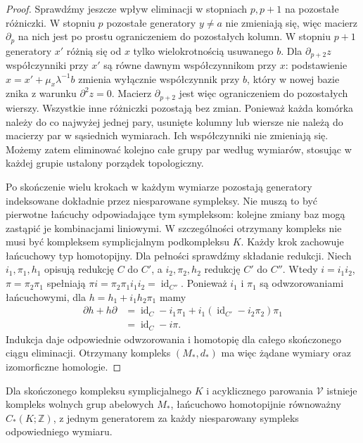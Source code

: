 \begin{proof}
Sprawdźmy jeszcze wpływ eliminacji w stopniach
$p,p+1$ na pozostałe różniczki. W stopniu $p$
pozostałe generatory $y\ne a$ nie zmieniają się,
więc macierz $\partial_p$ na nich jest po prostu
ograniczeniem do pozostałych kolumn. W stopniu $p+1$
generatory $x'$ różnią się od $x$ tylko wielokrotnością
usuwanego $b$. Dla $\partial_{p+2}z$ współczynniki
przy $x'$ są równe dawnym współczynnikom przy $x$:
podstawienie $x=x'+\mu_x\lambda^{-1}b$ zmienia
wyłącznie współczynnik przy $b$, który w nowej
bazie znika z warunku $\partial^2z=0$.
Macierz $\partial_{p+2}$ jest więc ograniczeniem
do pozostałych wierszy. Wszystkie inne różniczki
pozostają bez zmian. Ponieważ każda komórka należy
do co najwyżej jednej pary, usunięte kolumny lub
wiersze nie należą do macierzy par w sąsiednich
wymiarach. Ich współczynniki nie zmieniają się.
Możemy zatem eliminować kolejno całe grupy par
według wymiarów, stosując w każdej grupie ustalony
porządek topologiczny.

Po skończenie wielu krokach w każdym wymiarze
pozostają generatory indeksowane dokładnie przez
niesparowane sympleksy. Nie muszą to być pierwotne
łańcuchy odpowiadające tym sympleksom: kolejne
zmiany baz mogą zastąpić je kombinacjami liniowymi.
W szczególności otrzymany kompleks nie musi być
kompleksem symplicjalnym podkompleksu $K$.
Każdy krok zachowuje łańcuchowy typ homotopijny.
Dla pełności sprawdźmy składanie redukcji.
Niech $i_1,\pi_1,h_1$ opisują redukcję $C$ do $C'$,
a $i_2,\pi_2,h_2$ redukcję $C'$ do $C''$.
Wtedy $i=i_1i_2$, $\pi=\pi_2\pi_1$ spełniają
$\pi i=\pi_2\pi_1i_1i_2=\operatorname{id}_{C''}$.
Ponieważ $i_1$ i $\pi_1$ są odwzorowaniami
łańcuchowymi, dla $h=h_1+i_1h_2\pi_1$ mamy
\[
\begin{aligned}
 \partial h+h\partial
 &=\operatorname{id}_C-i_1\pi_1
   +i_1(\operatorname{id}_{C'}-i_2\pi_2)\pi_1\\
 &=\operatorname{id}_C-i\pi.
\end{aligned}
\]
Indukcja daje odpowiednie odwzorowania i homotopię
dla całego skończonego ciągu eliminacji.
Otrzymany kompleks $(M_*,d_*)$ ma więc żądane
wymiary oraz izomorficzne homologie.
\end{proof}

\begin{wniosek}
Dla skończonego kompleksu symplicjalnego $K$
i acyklicznego parowania $\mathcal V$ istnieje kompleks
wolnych grup abelowych $M_*$, łańcuchowo homotopijnie
równoważny $C_*(K;\mathbb Z)$, z jednym generatorem
za każdy niesparowany sympleks odpowiedniego wymiaru.
\end{wniosek}

